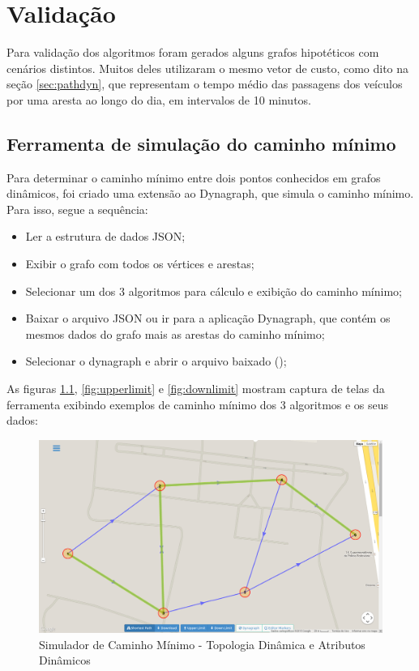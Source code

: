 \chapter{Validação}

Para validação dos algoritmos foram gerados alguns grafos hipotéticos com cenários distintos.
Muitos deles utilizaram o mesmo vetor de custo, como dito na seção \ref{sec:pathdyn}, que representam
o tempo médio das passagens dos veículos por uma aresta ao longo do dia, em intervalos de 10 minutos.


\section{Ferramenta de simulação do caminho mínimo}
Para determinar o caminho mínimo entre dois pontos conhecidos em grafos dinâmicos, foi criado
uma extensão ao Dynagraph, que simula o caminho mínimo. Para isso, segue a sequência:
\begin{itemize}
\item Ler a estrutura de dados JSON;
\item Exibir o grafo com todos os vértices e arestas;
\item Selecionar um dos 3 algoritmos para cálculo e exibição do caminho mínimo;
\item Baixar o arquivo JSON ou ir para a aplicação Dynagraph, que contém os mesmos dados do grafo mais as arestas do caminho mínimo;
\item Selecionar o dynagraph e abrir o arquivo baixado ();
\end{itemize}

As figuras \ref{fig:shortestpath}, \ref{fig:upperlimit} e \ref{fig:downlimit} mostram captura de telas
da ferramenta exibindo exemplos de caminho mínimo dos 3 algoritmos e os seus dados:

\begin{figure}[htbp]
\centering
 \includegraphics[width=.90\textwidth]{chapters/fig/shortestpath.png}
\caption{Simulador de Caminho Mínimo - Topologia Dinâmica e Atributos Dinâmicos}
\label{fig:shortestpath}
\end{figure}
\FloatBarrier

